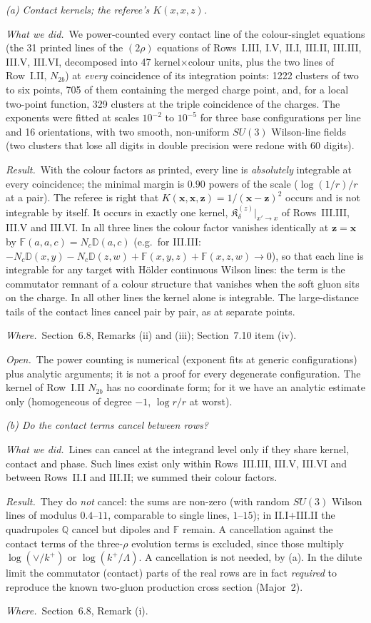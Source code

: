 \documentclass[a4paper,11pt]{article}
\def\v#1{\mathbf{#1}}
\def\mf#1{\mathbb{#1}}
\newcommand{\done}{\par\noindent\emph{What we did.}\ }
\newcommand{\result}{\par\noindent\emph{Result.}\ }
\newcommand{\where}{\par\noindent\emph{Where.}\ }
\newcommand{\open}{\par\noindent\emph{Open.}\ }
\begin{document}
\emph{(a) Contact kernels; the referee's $K(x,x,z)$.}
\done We power-counted every contact line of the colour-singlet equations (the 31 printed lines of the $(2\rho)$ equations of Rows~I.III, I.V, II.I, III.II, III.III, III.V, III.VI, decomposed into 47 kernel$\times$colour units, plus the two lines of Row~I.II, $N_{2b}$) at \emph{every} coincidence of its integration points: 1222 clusters of two to six points, 705 of them containing the merged charge point, and, for a local two-point function, 329 clusters at the triple coincidence of the charges. The exponents were fitted at scales $10^{-2}$ to $10^{-5}$ for three base configurations per line and 16 orientations, with two smooth, non-uniform $SU(3)$ Wilson-line fields (two clusters that lose all digits in double precision were redone with 60 digits).
\result With the colour factors as printed, every line is \emph{absolutely} integrable at every coincidence; the minimal margin is $0.90$ powers of the scale ($\log(1/r)/r$ at a pair). The referee is right that $K(\v x,\v x,\v z)=1/(\v x-\v z)^2$ occurs and is not integrable by itself. It occurs in exactly one kernel, $\mathfrak K^{(z)}_\delta|_{x'\to x}$ of Rows~III.III, III.V and III.VI. In all three lines the colour factor vanishes identically at $\v z=\v x$ by $\mf F(a,a,c)=N_c\mf D(a,c)$ (e.g.\ for III.III: $-N_c\mf D(x,y)-N_c\mf D(z,w)+\mf F(x,y,z)+\mf F(x,z,w)\to0$), so that each line is integrable for any target with H\"older continuous Wilson lines: the term is the commutator remnant of a colour structure that vanishes when the soft gluon sits on the charge. In all other lines the kernel alone is integrable. The large-distance tails of the contact lines cancel pair by pair, as at separate points.
\where Section~6.8, Remarks (ii) and (iii); Section~7.10 item (iv).
\open The power counting is numerical (exponent fits at generic configurations) plus analytic arguments; it is not a proof for every degenerate configuration. The kernel of Row~I.II $N_{2b}$ has no coordinate form; for it we have an analytic estimate only (homogeneous of degree $-1$, $\log r/r$ at worst).

\emph{(b) Do the contact terms cancel between rows?}
\done Lines can cancel at the integrand level only if they share kernel, contact and phase. Such lines exist only within Rows~III.III, III.V, III.VI and between Rows~II.I and III.II; we summed their colour factors.
\result They do \emph{not} cancel: the sums are non-zero (with random $SU(3)$ Wilson lines of modulus $0.4$--$11$, comparable to single lines, $1$--$15$); in II.I$+$III.II the quadrupoles $\mf Q$ cancel but dipoles and $\mf F$ remain. A cancellation against the contact terms of the three-$\rho$ evolution terms is excluded, since those multiply $\log(\vee/k^+)$ or $\log(k^+/\Lambda)$. A cancellation is not needed, by (a). In the dilute limit the commutator (contact) parts of the real rows are in fact \emph{required} to reproduce the known two-gluon production cross section (Major~2).
\where Section~6.8, Remark (i).
\end{document}
